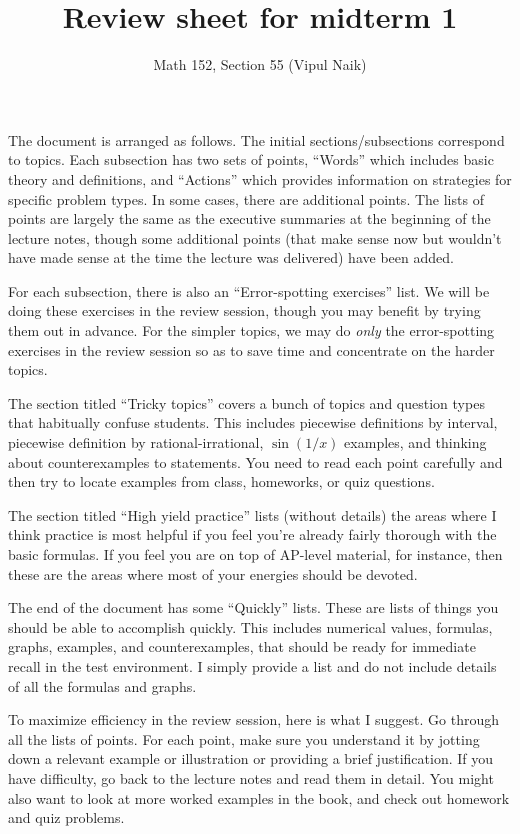 \documentclass[10pt]{amsart}
\title{Review sheet for midterm 1}
\author{Math 152, Section 55 (Vipul Naik)}
\begin{document}
\maketitle

The document is arranged as follows. The initial sections/subsections
correspond to topics. Each subsection has two sets of points,
``Words'' which includes basic theory and definitions, and ``Actions''
which provides information on strategies for specific problem
types. In some cases, there are additional points. The lists of points
are largely the same as the executive summaries at the beginning of
the lecture notes, though some additional points (that make sense now
but wouldn't have made sense at the time the lecture was delivered)
have been added.

For each subsection, there is also an ``Error-spotting exercises''
list. We will be doing these exercises in the review session, though
you may benefit by trying them out in advance. For the simpler topics,
we may do {\em only} the error-spotting exercises in the review
session so as to save time and concentrate on the harder topics.

The section titled ``Tricky topics'' covers a bunch of topics and
question types that habitually confuse students. This includes
piecewise definitions by interval, piecewise definition by
rational-irrational, $\sin(1/x)$ examples, and thinking about
counterexamples to statements. You need to read each point carefully
and then try to locate examples from class, homeworks, or quiz
questions.

The section titled ``High yield practice'' lists (without details) the
areas where I think practice is most helpful if you feel you're
already fairly thorough with the basic formulas. If you feel you are
on top of AP-level material, for instance, then these are the areas
where most of your energies should be devoted.

The end of the document has some ``Quickly'' lists. These are lists of
things you should be able to accomplish quickly. This includes
numerical values, formulas, graphs, examples, and counterexamples,
that should be ready for immediate recall in the test environment. I
simply provide a list and do not include details of all the formulas
and graphs.

To maximize efficiency in the review session, here is what I
suggest. Go through all the lists of points. For each point, make sure
you understand it by jotting down a relevant example or illustration
or providing a brief justification. If you have difficulty, go back to
the lecture notes and read them in detail. You might also want to look
at more worked examples in the book, and check out homework and quiz
problems.
\end{document}
